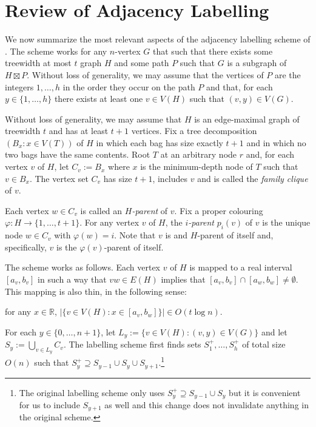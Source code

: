 \documentclass{article}
\newcommand{\R}{\mathbb{R}}
\begin{document}
\section{Review of Adjacency Labelling}
\label{review}

We now summarize the most relevant aspects of the adjacency labelling scheme of \citet{dujmovic.esperet.ea:adjacency}.  The scheme works for any $n$-vertex $G$ that such that there exists some treewidth at most $t$ graph $H$ and some path $P$ such that $G$ is a subgraph of $H\boxtimes P$. Without loss of generality, we may assume that the vertices of $P$ are the integers $1,\ldots,h$ in the order they occur on the path $P$ and that, for each $y\in\{1,\ldots,h\}$ there exists at least one $v\in V(H)$ such that $(v,y)\in V(G)$.

Without loss of generality, we may assume that $H$ is an edge-maximal graph of treewidth $t$ and has at least $t+1$ vertices.  Fix a tree decomposition $(B_x:x\in V(T))$ of $H$ in which each bag has size exactly $t+1$ and in which no two bags have the same contents.  Root $T$ at an arbitrary node $r$ and, for each vertex $v$ of $H$, let $C_v:=B_x$ where $x$ is the minimum-depth node of $T$ such that $v\in B_x$.  The vertex set $C_v$ has size $t+1$, includes $v$ and is called the \emph{family clique} of $v$.

Each vertex $w\in C_v$ is called an \emph{$H$-parent} of $v$.  Fix a proper colouring $\varphi:H\to\{1,\ldots,t+1\}$.  For any vertex $v$ of $H$, the \emph{$i$-parent} $p_i(v)$ of $v$ is the unique node $w\in C_v$ with $\varphi(w)=i$.  Note that $v$ is and $H$-parent of itself and, specifically, $v$ is the $\varphi(v)$-parent of itself.

The scheme works as follows. Each vertex $v$ of $H$ is mapped to a real interval $[a_v,b_v]$ in such a way that $vw\in E(H)$ implies that $[a_v,b_v]\cap [a_w,b_w]\neq\emptyset$.  This mapping is also thin, in the following sense:

\begin{compactenum}[(P1)]
    \item for any $x\in \R$, $|\{v\in V(H): x\in[a_v,b_w]\}|\in O(t\log n)$.\label{thin}
\end{compactenum}

For each $y\in\{0,\ldots,n+1\}$, let $L_y:=\{v\in V(H): (v,y)\in V(G)\}$ and let $S_y:=\bigcup_{v\in L_y}C_v$.  The labelling scheme first finds sets $S^+_1,\ldots,S^+_h$ of total size $O(n)$ such that $S^+_y\supseteq S_{y-1}\cup S_y\cup S_{y+1}$.\footnote{The original labelling scheme only uses $S^+_y\supseteq S_{y-1}\cup S_y$ but it is convenient for us to include $S_{y+1}$ as well and this change does not invalidate anything in the original scheme.}
\end{document}
